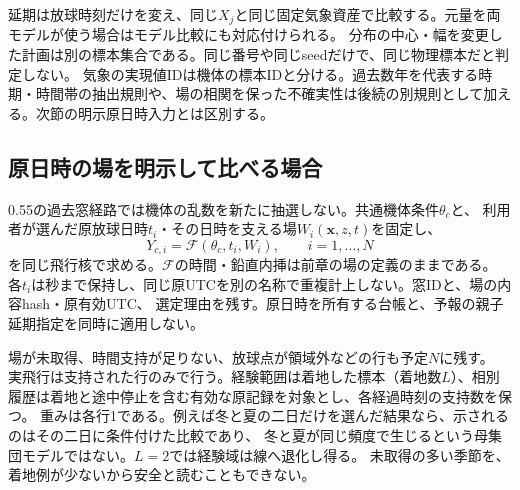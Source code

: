 \documentclass[11pt,a4paper]{article}
\begin{document}
\begin{center}
\end{center}
延期は放球時刻だけを変え、同じ$X_j$と同じ固定気象資産で比較する。元量を両モデルが使う場合はモデル比較にも対応付けられる。
分布の中心・幅を変更した計画は別の標本集合である。同じ番号や同じseedだけで、同じ物理標本だと判定しない。
気象の実現値IDは機体の標本IDと分ける。過去数年を代表する時期・時間帯の抽出規則や、場の相関を保った不確実性は後続の別規則として加える。次節の明示原日時入力とは区別する。


\subsection{原日時の場を明示して比べる場合}\label{th:historical-windows}
0.55の過去窓経路では機体の乱数を新たに抽選しない。共通機体条件$\theta_c$と、
利用者が選んだ原放球日時$t_i$・その日時を支える場$W_i(\boldsymbol{x},z,t)$を固定し、
\begin{equation}
 Y_{c,i}=\mathcal F(\theta_c,t_i,W_i),\qquad i=1,\ldots,N
\end{equation}
を同じ飛行核で求める。$\mathcal F$の時間・鉛直内挿は前章の場の定義のままである。
各$t_i$は秒まで保持し、同じ原UTCを別の名称で重複計上しない。窓IDと、場の内容hash・原有効UTC、
選定理由を残す。原日時を所有する台帳と、予報の親子延期指定を同時に適用しない。

場が未取得、時間支持が足りない、放球点が領域外などの行も予定$N$に残す。
実飛行は支持された行のみで行う。経験範囲は着地した標本（着地数$L$）、相別履歴は着地と途中停止を含む有効な原記録を対象とし、各経過時刻の支持数を保つ。
重みは各行1である。例えば冬と夏の二日だけを選んだ結果なら、示されるのはその二日に条件付けた比較であり、
冬と夏が同じ頻度で生じるという母集団モデルではない。$L=2$では経験域は線へ退化し得る。
未取得の多い季節を、着地例が少ないから安全と読むこともできない。
\end{document}
